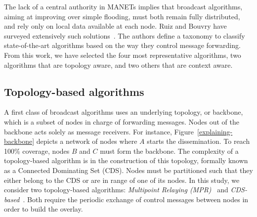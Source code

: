 The lack of a central authority in MANETs implies
that broadcast algorithms, aiming at improving over simple flooding,
must both remain fully distributed, and rely only on local data available at each node.
Ruiz and Bouvry have surveyed extensively such solutions~\cite{Ruiz2015}.
%
The authors define a taxonomy to classify state-of-the-art algorithms based on the way they control message forwarding.
%
From this work, we have selected the four most representative
algorithms, two algorithms that are topology aware, and two others
that are context aware.    
%
%
%

%

\subsection{Topology-based algorithms}

A first class of broadcast algorithms uses an underlying topology, or backbone, which is a subset of nodes in charge of forwarding messages.
%
Nodes out of the backbone acts solely as message receivers.
%
For instance, Figure~\ref{explaining-backbone} depicts a network of nodes where $A$ starts the dissemination.
%
To reach 100\% coverage, nodes $B$ and $C$ must form the backbone.
%
The complexity of a topology-based algorithm is in the construction of this topology, formally known as a Connected Dominating Set (CDS).
%
Nodes must be partitioned such that they either belong to the CDS or are in range of one of its nodes.
%
In this study, we consider two topology-based algorithms: \emph{Multipoint Relaying (MPR)}~\cite{Qayyum2002} and \emph{CDS-based}~\cite{Wu2001}.
Both require the periodic exchange of control messages between nodes in order to build the overlay.

